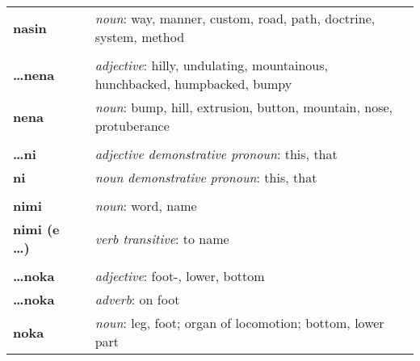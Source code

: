 \begin{supertabular}{p{2,5cm}|ll}
    \textbf{nasin}               &  & \textit{noun}: way, manner, custom, road, path, doctrine, system, method                                   \\
                                 &  &                                                                                                            \\
    \textbf{\dots nena}          &  & \textit{adjective}: hilly, undulating, mountainous, hunchbacked, humpbacked, bumpy                         \\
    \textbf{nena}                &  & \textit{noun}: bump, hill, extrusion, button, mountain, nose, protuberance                                 \\
                                 &  &                                                                                                            \\
    \textbf{\dots ni}            &  & \textit{adjective demonstrative pronoun}: this, that                                                       \\
    \textbf{ni}                  &  & \textit{noun demonstrative pronoun}: this, that                                                            \\
                                 &  &                                                                                                            \\
    \textbf{nimi}                &  & \textit{noun}: word, name                                                                                  \\
    \textbf{nimi (e \dots )}     &  & \textit{verb transitive}: to name                                                                          \\
                                 &  &                                                                                                            \\
    \textbf{\dots noka}          &  & \textit{adjective}: foot-, lower, bottom                                                                   \\
    \textbf{ \dots noka }        &  & \textit{adverb}: on foot                                                                                   \\
    \textbf{noka}                &  & \textit{noun}: leg, foot; organ of locomotion; bottom, lower part                                          \\

\end{supertabular}
